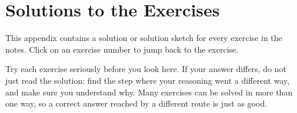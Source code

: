 %
\chapter{Solutions to the Exercises}\label{app:solutions}

This appendix contains a solution or solution sketch for every exercise in
the notes. Click on an exercise number to jump back to the exercise.

Try each exercise seriously before you look here. If your answer differs,
do not just read the solution: find the step where your reasoning went a
different way, and make sure you understand why. Many exercises can be
solved in more than one way, so a correct answer reached by a different
route is just as good.

\printsolutions
